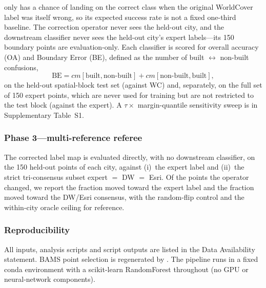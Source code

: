 \documentclass[remotesensing,article,submit,moreauthors]{Definitions/mdpi}
\begin{document}
only has a chance of landing on the correct class when the original
WorldCover label was itself wrong, so its expected success rate is not a
fixed one-third baseline. The correction operator never sees the held-out city,
and the downstream classifier never sees the held-out city's expert
labels---its 150 boundary points are evaluation-only. Each classifier is
scored for overall accuracy (OA) and Boundary Error (BE), defined as the
number of built $\leftrightarrow$ non-built confusions,
%
\begin{equation}\label{eq:be}
\mathrm{BE} = cm[\text{built}, \text{non-built}] + cm[\text{non-built}, \text{built}],
\end{equation}
%
on the held-out spatial-block test set (against WC) and, separately, on the
full set of 150 expert points, which are never used for training but are not
restricted to the test block (against the expert). A $\tau \times$
margin-quantile sensitivity sweep is in Supplementary Table~S1.

\subsubsection*{Phase 3---multi-reference referee}

The corrected label map is evaluated directly, with no downstream classifier,
on the 150 held-out points of each city,
against (i)~the expert label and (ii)~the strict tri-consensus subset expert
$=$ DW $=$ Esri. Of the points the operator changed, we report the fraction
moved toward the expert label and the fraction moved toward the DW/Esri
consensus, with the random-flip control and the within-city oracle ceiling for
reference.

\subsubsection*{Reproducibility}

All inputs, analysis scripts and script outputs are listed in the Data
Availability statement. BAMS point selection is regenerated by
. The pipeline runs in a fixed
conda environment with a scikit-learn RandomForest throughout (no GPU or
neural-network components).
\end{document}
